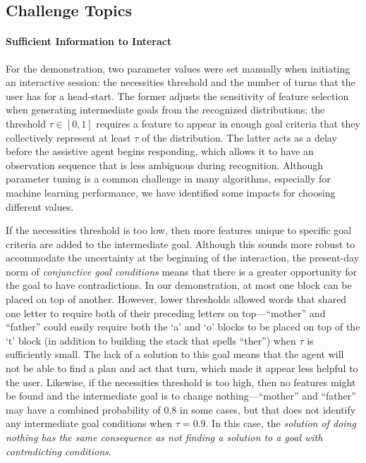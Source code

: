 \documentclass[letterpaper]{article} %
\begin{document}
\subsection{Challenge Topics\label{sec:challenges.topics}}
\paragraph{Sufficient Information to Interact} For the demonstration, two parameter values were set manually when initiating an interactive session: the necessities threshold and the number of turns that the user has for a head-start.  The former adjusts the sensitivity of feature selection when generating intermediate goals from the recognized distributions; the threshold $\tau \in [0, 1]$ requires a feature to appear in enough goal criteria that they collectively represent at least $\tau$ of the distribution.  The latter acts as a delay before the assistive agent begins responding, %
 which allows it to have an observation sequence that is less ambiguous during recognition.  Although parameter tuning is a common challenge in many algorithms, especially for machine learning performance, we have identified some impacts for choosing different values.

If the necessities threshold is too low, then more features unique to specific goal criteria are added to the intermediate goal.  Although this sounds more robust to accommodate the uncertainty at the beginning of the interaction, the present-day norm of \textit{conjunctive goal conditions} means that there is a greater opportunity for the goal to have contradictions.  In our demonstration, at most one block can be placed on top of another.  However, lower thresholds allowed words that shared one letter to require both of their preceding letters on top---``mother'' and ``father'' could easily require both the `a' and `o' blocks to be placed on top of the `t' block (in addition to building the stack that spells ``ther'') when $\tau$ is sufficiently small. 
 The lack of a solution to this goal means that the agent will not be able to find a plan and act that turn, which made it appear less helpful to the user.  Likewise, if the necessities threshold is too high, then no features might be found and the intermediate goal is to change nothing---``mother'' and ``father'' may have a combined probability of $0.8$ in some cases, but that does not identify any intermediate goal conditions when $\tau = 0.9$. 
 In this case, the \textit{solution of doing nothing has the same consequence as not finding a solution to a goal with contradicting conditions}.
\end{document}
